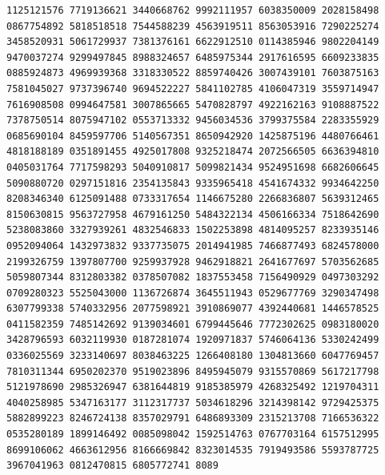 \begin{Verbatim}[fontsize=\fontsize{6.4}{7.3}\selectfont]
1125121576 7719136621 3440668762 9992111957 6038350009 2028158498 0867754892 5818518518 7544588239 4563919511 8563053916 7290225274
3458520931 5061729937 7381376161 6622912510 0114385946 9802204149 9470037274 9299497845 8988324657 6485975344 2917616595 6609233835
0885924873 4969939368 3318330522 8859740426 3007439101 7603875163 7581045027 9737396740 9694522227 5841102785 4106047319 3559714947
7616908508 0994647581 3007865665 5470828797 4922162163 9108887522 7378750514 8075947102 0553713332 9456034536 3799375584 2283355929
0685690104 8459597706 5140567351 8650942920 1425875196 4480766461 4818188189 0351891455 4925017808 9325218474 2072566505 6636394810
0405031764 7717598293 5040910817 5099821434 9524951698 6682606645 5090880720 0297151816 2354135843 9335965418 4541674332 9934642250
8208346340 6125091488 0733317654 1146675280 2266836807 5639312465 8150630815 9563727958 4679161250 5484322134 4506166334 7518642690
5238083860 3327939261 4832546833 1502253898 4814095257 8233935146 0952094064 1432973832 9337735075 2014941985 7466877493 6824578000
2199326759 1397807700 9259937928 9462918821 2641677697 5703562685 5059807344 8312803382 0378507082 1837553458 7156490929 0497303292
0709280323 5525043000 1136726874 3645511943 0529677769 3290347498 6307799338 5740332956 2077598921 3910869077 4392440681 1446578525
0411582359 7485142692 9139034601 6799445646 7772302625 0983180020 3428796593 6032119930 0187281074 1920971837 5746064136 5330242499
0336025569 3233140697 8038463225 1266408180 1304813660 6047769457 7810311344 6950202370 9519023896 8495945079 9315570869 5617217798
5121978690 2985326947 6381644819 9185385979 4268325492 1219704311 4040258985 5347163177 3112317737 5034618296 3214398142 9729425375
5882899223 8246724138 8357029791 6486893309 2315213708 7166536322 0535280189 1899146492 0085098042 1592514763 0767703164 6157512995
8699106062 4663612956 8166669842 8323014535 7919493586 5593787725 3967041963 0812470815 6805772741 8089
\end{Verbatim}
